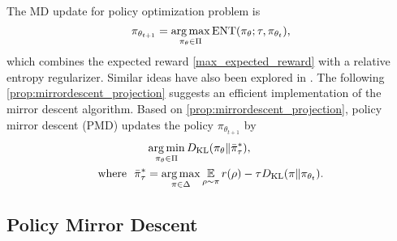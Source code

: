 The MD update for policy optimization problem is 
\begin{equation}
\pi_{\theta_{t+1}} = \operatorname*{arg\,max}\limits_{\pi_\theta \in \Pi}  \text{ENT}(\pi_\theta; \tau, \pi_{\theta_t}), 
\end{equation}
which combines the expected reward \cref{max_expected_reward} with a relative entropy regularizer. Similar ideas have also been explored in \citet{peters2007reinforcement,wierstra2008episodic,peters2010relative,schulman2015trust,montgomery2016guided,nachum2017trust,haarnoja2018soft,abdolmaleki2018maximum}. The following \cref{prop:mirrordescent_projection} suggests an efficient implementation of the mirror descent algorithm.
Based on \cref{prop:mirrordescent_projection}, policy mirror descent (PMD) updates the policy $\pi_{\theta_{t+1}}$ by
\begin{equation}
\begin{split}
&\operatorname*{arg\,min}\limits_{\pi_\theta \in \Pi}{D_{\mathrm{KL}}( \pi_\theta \| \bar{\pi}_{\tau}^* )}, \\
\text{where}\ \ \bar{\pi}_{\tau}^* & =  \operatorname*{arg\,max}\limits_{\pi \in \Delta}{ \operatorname*{\mathbb{E}}\limits_{\rho \sim \pi}{  r(\rho)  - \tau D_{\mathrm{KL}}(\pi \| \pi_{\theta_t}) } }.
\end{split}
\end{equation}
\fi

\subsection{Policy Mirror Descent}
\label{subsec:revisitTRPO}

